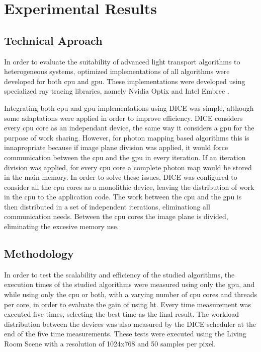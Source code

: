 \chapter{Experimental Results}

\section{Technical Aproach}

In order to evaluate the suitability of advanced light transport algorithms to heterogeneous systems, optimized implementations of all algorithms were developed for both \gls{cpu} and \gls{gpu}. These implementations were developed using specialized ray tracing libraries, namely Nvidia Optix \citep{parker2010optix} and Intel Embree \citep{wald2014embree}.

Integrating both \gls{cpu} and \gls{gpu} implementations using DICE was simple, although some adaptations were applied in order to improve efficiency. DICE considers every \gls{cpu} core as an independant device, the same way it considers a \gls{gpu} for the purpose of work sharing. However, for photon mapping based algorithms this is innapropriate because if image plane division was applied, it would force communication between the \gls{cpu} and the \gls{gpu} in every iteration. If an iteration division was applied, for every \gls{cpu} core a complete photon map would be stored in the main memory. In order to solve these issues, DICE was configured to consider all the \gls{cpu} cores as a monolithic device, leaving the distribution of work in the \gls{cpu} to the application code. The work between the \gls{cpu} and the \gls{gpu} is then distributed in a set of independent iterations, eliminationg all communication needs. Between the \gls{cpu} cores the image plane is divided, eliminating the excesive memory use.

\section{Methodology}

In order to test the scalability and efficiency of the studied algorithms, the execution times of the studied algorithms were measured using only the \gls{gpu}, and while using only the \gls{cpu} or both, with a varying number of \gls{cpu} cores and threads per core, in order to evaluate the gain of using \gls{ht}. Every time measurement was executed five times, selecting the best time as the final result. The workload distribution between the devices was also measured by the DICE scheduler at the end of the five time measurements. These tests were executed using the Living Room Scene with a resolution of 1024x768 and 50 samples per pixel.

